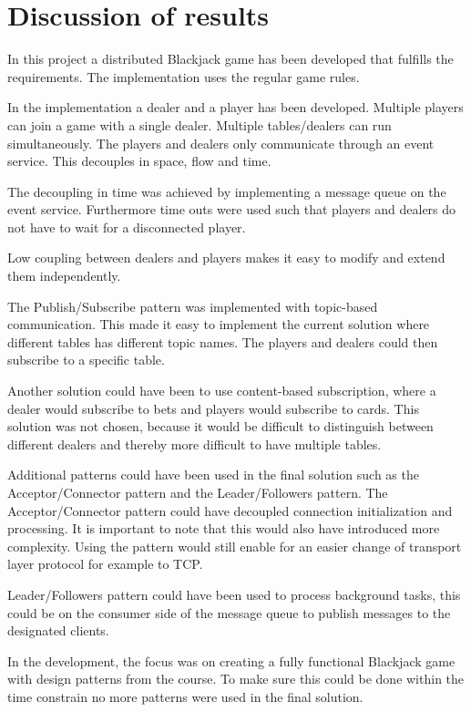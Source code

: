 \chapter{Discussion of results}
In this project a distributed Blackjack game has been developed that fulfills the requirements. The implementation uses the regular game rules.

In the implementation a dealer and a player has been developed. Multiple players can join a game with a single dealer. Multiple tables/dealers can run simultaneously. The players and dealers only communicate through an event service. This decouples in space, flow and time.

The decoupling in time was achieved by implementing a message queue on the event service. Furthermore time outs were used such that players and dealers do not have to wait for a disconnected player.

Low coupling between dealers and players makes it easy to modify and extend them independently.

The Publish/Subscribe pattern was implemented with topic-based communication. This made it easy to implement the current solution where different tables has different topic names. The players and dealers could then subscribe to a specific table.

Another solution could have been to use content-based subscription, where a dealer would subscribe to bets and players would subscribe to cards. This solution was not chosen, because it would be difficult to distinguish between different dealers and thereby more difficult to have multiple tables.

Additional patterns could have been used in the final solution such as the Acceptor/Connector pattern and the Leader/Followers pattern. The Acceptor/Connector pattern could have decoupled connection initialization and processing. It is important to note that this would also have introduced more complexity. Using the pattern would still enable for an easier change of transport layer protocol for example to TCP.

Leader/Followers pattern could have been used to process background tasks, this could be on the consumer side of the message queue to publish messages to the designated clients.

In the development, the focus was on creating a fully functional Blackjack game with design patterns from the course. To make sure this could be done within the time constrain no more patterns were used in the final solution.